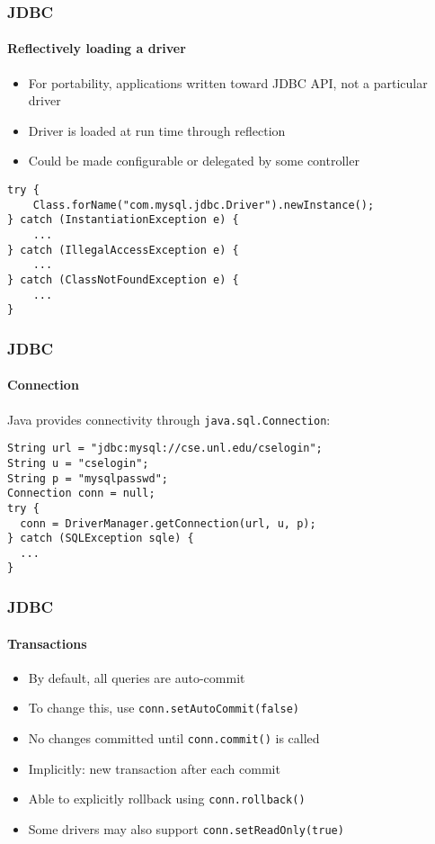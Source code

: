 \documentclass{beamer}
\begin{document}
\begin{frame}[fragile]
  \frametitle{JDBC}
  \framesubtitle{Reflectively loading a driver}

\begin{itemize}
  \item For portability, applications written toward JDBC API, not a particular driver
  \item Driver is loaded at run time through reflection
  \item Could be made configurable or delegated by some controller
\end{itemize}

\begin{verbatim}
try {
    Class.forName("com.mysql.jdbc.Driver").newInstance();
} catch (InstantiationException e) {
    ...
} catch (IllegalAccessException e) {
    ...
} catch (ClassNotFoundException e) {
    ...
}
\end{verbatim}

\end{frame}

\begin{frame}[fragile]
  \frametitle{JDBC}
  \framesubtitle{Connection}

Java provides connectivity through \texttt{java.sql.Connection}:

\begin{verbatim}
String url = "jdbc:mysql://cse.unl.edu/cselogin";
String u = "cselogin";
String p = "mysqlpasswd";
Connection conn = null;
try {
  conn = DriverManager.getConnection(url, u, p);
} catch (SQLException sqle) {
  ...
}
\end{verbatim}

\end{frame}

\begin{frame}[fragile]
  \frametitle{JDBC}
  \framesubtitle{Transactions}

\begin{itemize}
  \item By default, all queries are auto-commit
  \item To change this, use \texttt{conn.setAutoCommit(false)}
  \item No changes committed until \texttt{conn.commit()} is called
  \item Implicitly: new transaction after each commit
  \item Able to explicitly rollback using \texttt{conn.rollback()}
  \item Some drivers may also support \texttt{conn.setReadOnly(true)}
\end{itemize}

\end{frame}
\end{document}
